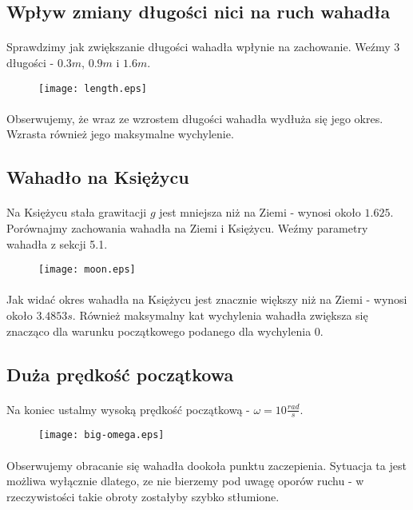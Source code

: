 \documentclass{article}
\begin{document}
\subsection{Wpływ zmiany długości nici na ruch wahadła}
\paragraph{}
Sprawdzimy jak zwiększanie długości wahadła wpłynie na zachowanie. Weźmy 3 długości - $0.3m$, $0.9m$ i $1.6m$.
\begin{figure}[H]
  \texttt{[image: length.eps]}
\end{figure}
\paragraph{}
Obserwujemy, że wraz ze wzrostem długości wahadła wydłuża się jego okres. Wzrasta również jego maksymalne wychylenie.
\subsection{Wahadło na Księżycu}
\paragraph{}
Na Księżycu stała grawitacji $g$ jest mniejsza niż na Ziemi - wynosi około $1.625$. Porównajmy zachowania wahadła na Ziemi i Księżycu. Weźmy parametry wahadła z sekcji 5.1.
\begin{figure}[H]
  \texttt{[image: moon.eps]}
\end{figure}
\paragraph{}
Jak widać okres wahadła na Księżycu jest znacznie większy niż na Ziemi - wynosi około $3.4853s$. Również maksymalny kat wychylenia wahadła zwiększa się znacząco dla warunku początkowego podanego dla wychylenia 0.
\subsection{Duża prędkość początkowa}
\paragraph{}
Na koniec ustalmy wysoką prędkość początkową - $\omega = 10 \frac{rad}{s}$.
\begin{figure}[H]
  \texttt{[image: big-omega.eps]}
\end{figure}
\paragraph{}
Obserwujemy obracanie się wahadła dookoła punktu zaczepienia. Sytuacja ta jest możliwa wyłącznie dlatego, ze nie bierzemy pod uwagę oporów ruchu - w rzeczywistości takie obroty zostałyby szybko stłumione.
\end{document}
